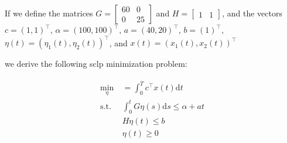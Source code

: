 \documentclass[11pt,a4paper,titlepage]{article}
\theoremstyle{definition}
\theoremstyle{plain}
\begin{document}
{        If we define the matrices
        $
        G =
        \begin{bmatrix}
            60 & 0 \\
            0 & 25
        \end{bmatrix}
        $
        and
        $
        H =
        \begin{bmatrix}
            1 & 1
        \end{bmatrix}
        $,
        and the vectors
        $
        c = (1,1)^\top
        $,
        $
        \alpha = (100,100)^\top
        $,
        $
        a = (40,20)^\top
        $,
        $
        b = (1)^\top
        $,
        $
        \eta(t) = (\eta_1(t), \eta_2(t))^\top
        $,
        and
        $
        x(t) = (x_1(t), x_2(t))^\top
        $

        we derive the following \gls{sclp} minimization problem:

        \begin{align}
            \begin{split}
                \min\limits_{\eta}
                &~ = \int_0^T c^\top x(t) \mathrm{d}t \\
                \text{s.t.}
                &~ \int_0^t G \eta(s) \mathrm{d}s \leq \alpha + a t \\
                &~ H \eta(t) \leq b \\
                &~ \eta(t) \geq 0
            \end{split}
        \end{align}

}
\end{document}
